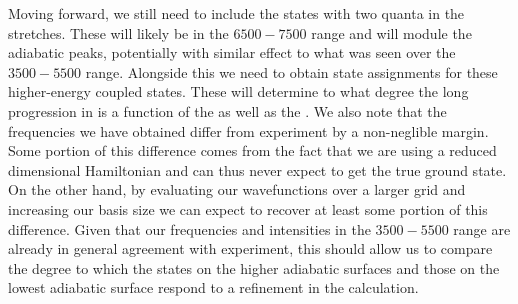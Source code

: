 %
%

Moving forward, we still need to include the states with two quanta in the \htwo{} stretches. These will likely be in the \squigg$6500-7500$ \wavenumbers{} range and will module the adiabatic peaks, potentially with similar effect to what was seen over the \squigg$3500-5500$ \wavenumbers{} range. Alongside this we need to obtain state assignments for these higher-energy coupled states. These will determine to what degree the long progression in \hfive{} is a function of the \htwo{} as well as the \hplus{}. We also note that the frequencies we have obtained differ from experiment by a non-neglible margin. Some portion of this difference comes from the fact that we are using a reduced dimensional Hamiltonian and can thus never expect to get the true ground state. On the other hand, by evaluating our wavefunctions over a larger grid and increasing our basis size we can expect to recover at least some portion of this difference. Given that our frequencies and intensities in the \squigg$3500-5500$ \wavenumbers{} range are already in general agreement with experiment, this should allow us to compare the degree to which the \hplus{} states on the higher adiabatic surfaces and those on the lowest adiabatic surface respond to a refinement in the calculation.
%
